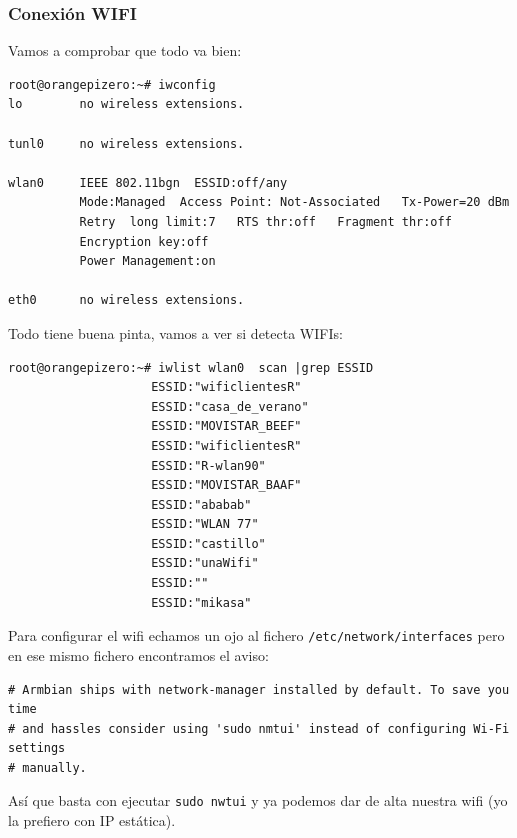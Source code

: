 \documentclass[12pt,spanish,]{article}
\begin{document}
\subsubsection{Conexión WIFI}\label{conexiuxf3n-wifi}

Vamos a comprobar que todo va bien:

\begin{verbatim}
root@orangepizero:~# iwconfig
lo        no wireless extensions.

tunl0     no wireless extensions.

wlan0     IEEE 802.11bgn  ESSID:off/any
          Mode:Managed  Access Point: Not-Associated   Tx-Power=20 dBm
          Retry  long limit:7   RTS thr:off   Fragment thr:off
          Encryption key:off
          Power Management:on

eth0      no wireless extensions.
\end{verbatim}

Todo tiene buena pinta, vamos a ver si detecta WIFIs:

\begin{verbatim}
root@orangepizero:~# iwlist wlan0  scan |grep ESSID
                    ESSID:"wificlientesR"
                    ESSID:"casa_de_verano"
                    ESSID:"MOVISTAR_BEEF"
                    ESSID:"wificlientesR"
                    ESSID:"R-wlan90"
                    ESSID:"MOVISTAR_BAAF"
                    ESSID:"ababab"
                    ESSID:"WLAN 77"
                    ESSID:"castillo"
                    ESSID:"unaWifi"
                    ESSID:""
                    ESSID:"mikasa"
\end{verbatim}

Para configurar el wifi echamos un ojo al fichero
\texttt{/etc/network/interfaces} pero en ese mismo fichero encontramos
el aviso:

\begin{verbatim}
# Armbian ships with network-manager installed by default. To save you time
# and hassles consider using 'sudo nmtui' instead of configuring Wi-Fi settings
# manually.
\end{verbatim}

Así que basta con ejecutar \texttt{sudo\ nwtui} y ya podemos dar de alta
nuestra wifi (yo la prefiero con IP estática).
\end{document}
